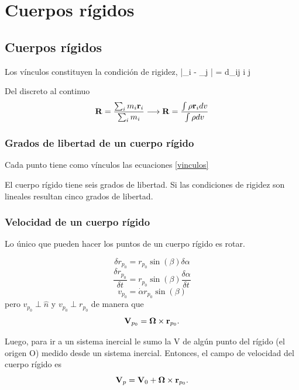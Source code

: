 \documentclass[10pt,oneside]{CBFT_book}
\begin{document}
\chapter{Cuerpos rígidos}

\section{Cuerpos rígidos}

Los vínculos constituyen la condición de rigidez,
\be
	|_i - _j | = d_{ij}	\qquad i \neq j
\label{vinculos}
\ee

Del discreto al continuo
\[
	\vb{R} = \frac{\sum_i m_i\vb{r}_i}{\sum_i m_i} \longrightarrow 
	\vb{R} = \frac{\int \rho \vb{r}_i dv }{\int \rho dv} 
\]

\subsection{Grados de libertad de un cuerpo rígido}

Cada punto tiene como vínculos las ecuaciones \eqref{vinculos}

El cuerpo rígido tiene seis grados de libertad.
Si las condiciones de rigidez son lineales resultan cinco grados de libertad.

\subsection{Velocidad de un cuerpo rígido}

Lo único que pueden hacer los puntos de un cuerpo rígido es rotar.

\[
	\delta r_{p_0} = r_{p_0} \sin(\beta) \delta \alpha
\]
\[
	\frac{\delta r_{p_0}}{\delta t} = r_{p_0} \sin(\beta) \frac{\delta\alpha}{\delta t}
\]
\[
	v_{p_0} = \dot{\alpha} r_{p_0} \sin(\beta)
\]
pero $v_{p_0} \perp \hat{n}$ y $v_{p_0} \perp r_{p_0}$ de manera que 
\[
	\vb{V}_{p_0} = \vb{\Omega} \times \vb{r}_{p_0}.
\]

Luego, para ir a un sistema inercial le sumo la V de algún punto del rígido (el origen O)
medido desde un sistema inercial. Entonces, el campo de velocidad del cuerpo rígido es
\[
	\vb{V}_{p} = \vb{V}_0 + \vb{\Omega} \times \vb{r}_{p_0}.
\]
\end{document}
